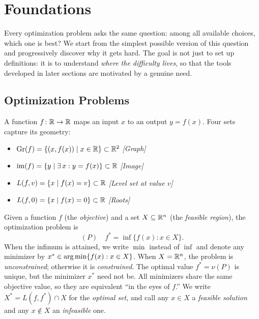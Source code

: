 \section{Foundations}\label{sec:foundations}

Every optimization problem asks the same question: among all available choices, which one is best? We start from the simplest possible version of this question and progressively discover why it gets hard. The goal is not just to set up definitions: it is to understand \emph{where the difficulty lives}, so that the tools developed in later sections are motivated by a genuine need.

\subsection{Optimization Problems}\label{sec:opt-problems}

\begin{definition}\label{def:univariate-fn}
	A function $f \colon \mathbb{R} \to \mathbb{R}$ maps an input $x$ to an output $y = f(x)$.
	Four sets capture its geometry:
	\begin{itemize}
		\item $\operatorname{Gr}(f) = \{(x, f(x)) \mid x \in \mathbb{R}\} \subset \mathbb{R}^2$
			\hfill\textit{[Graph]}
		\item $\operatorname{im}(f) = \{y \mid \exists\, x : y = f(x)\} \subset \mathbb{R}$
			\hfill\textit{[Image]}
		\item $L(f, v) = \{x \mid f(x) = v\} \subset \mathbb{R}$
			\hfill\textit{[Level set at value $v$]}
		\item $L(f, 0) = \{x \mid f(x) = 0\} \subset \mathbb{R}$
			\hfill\textit{[Roots]}
	\end{itemize}
\end{definition}

\begin{definition}\label{def:minimization}
	Given a function $f$ (the \emph{objective}) and a set $X \subseteq \mathbb{R}^n$ (the \emph{feasible region}), the optimization problem is
	\begin{equation}\label{eq:opt-problem}
		(P) \quad f^* = \inf\{f(x) : x \in X\}.
	\end{equation}
	When the infimum is attained, we write $\min$ instead of $\inf$ and denote any minimizer by $x^* \in \operatorname*{arg\,min}\{f(x) : x \in X\}$.
	When $X = \mathbb{R}^n$, the problem is \emph{unconstrained}; otherwise it is \emph{constrained}. The optimal value $f^* = \nu(P)$ is unique, but the minimizer $x^*$ need not be. All minimizers share the same objective value, so they are equivalent ``in the eyes of $f$.'' We write $X^* = L(f, f^*) \cap X$ for the \emph{optimal set}, and call any $x \in X$ a \emph{feasible solution} and any $x \notin X$ an \emph{infeasible} one.
\end{definition}

